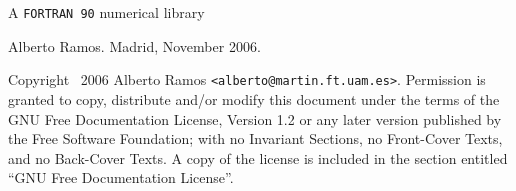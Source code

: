 \thispagestyle{titlingpage}
\begin{center}

\vspace*{1in}
{\Huge A \texttt{FORTRAN 90} numerical library\par
}
\vspace*{\fill}

\vspace{1.2cm}
{Alberto Ramos. Madrid, November 2006.}

\end{center}

\newpage

Copyright \textcopyright\, 2006  Alberto Ramos
\texttt{<alberto@martin.ft.uam.es>}. 
Permission is granted to copy, distribute and/or modify this document
under the terms of the GNU Free Documentation License, Version 1.2
or any later version published by the Free Software Foundation;
with no Invariant Sections, no Front-Cover Texts, and no Back-Cover
Texts.  A copy of the license is included in the section entitled ``GNU
Free Documentation License''.



